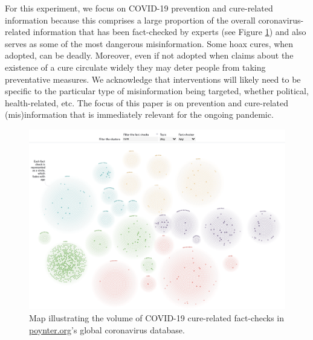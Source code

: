 \documentclass[letterpaper, 12pt, parskip=full,DIV=10]{scrartcl}
\begin{document}
For this experiment, we focus on COVID-19 prevention and cure-related information because this comprises a large proportion of the overall coronavirus-related information that has been fact-checked by experts (see Figure \ref{fig:poynter_cures}) and also serves as some of the most dangerous misinformation. Some hoax cures, when adopted, can be deadly. Moreover, even if not adopted when claims about the existence of a cure circulate widely they may deter people from taking preventative measures. We acknowledge that interventions will likely need to be specific to the particular type of misinformation being targeted, whether political, health-related, etc. The focus of this paper is on prevention and cure-related (mis)information that is immediately relevant for the ongoing pandemic. 


\begin{figure}[!htb]
\centering
\caption{Map illustrating the volume of COVID-19 cure-related fact-checks in \url{poynter.org}'s global coronavirus database.}
\label{fig:poynter_cures}
\includegraphics[width=.95\textwidth]{figures/poynter_cures.png} 
\end{figure}
\end{document}

